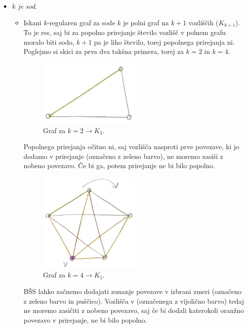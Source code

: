 \documentclass[a4paper,11pt]{article}
\begin{document}
\noindent
\begin{itemize}
\item \textit{$k$ je sod}. 
    \begin{itemize}[label={}]
        \item Iskani $k$-regularen graf za sode $k$ je polni graf na $k + 1$ vozliščih ($K_{k + 1}$). To je res, saj bi za popolno prirejanje število vozlišč v polnem grafu moralo biti sodo, $k + 1$ pa je liho število, torej popolnega prirejanja ni.
                Poglejmo si skici za prva dva takšna primera, torej za $k = 2$ in $k = 4$.

                        \begin{figure}[ht!]
                            \centering
                            \includegraphics[width=50mm]{Slike/k_sod_1.png}
                            \caption{Graf za $k = 2 \rightarrow K_3$.}
                        \end{figure}
                        \noindent
                        Popolnega prirejanja očitno ni, saj vozlišča nasproti prve povezave, ki jo dodamo v prirejanje (označeno z zeleno barvo), ne moremo zasiši z nobeno povezavo. Če bi ga, potem prirejanje ne bi bilo popolno.
                                
                        \newpage
                        \begin{figure}[ht!]
                            \centering
                            \includegraphics[width=50mm]{Slike/k_sod_2.png}
                            \caption{Graf za $k = 4 \rightarrow K_5$.}
                        \end{figure}
                        \noindent
                        BŠS lahko začnemo dodajati zunanje povezave v izbrani zmeri (označeno z zeleno barvo in puščico). Vozlišča v (označenega z vijolično barvo) tedaj ne moremo zasičiti z nobeno povezavo, saj če bi dodali katerokoli oranžno povezavo v prirejanje, ne bi bilo popolno.
    

\end{itemize}
\end{itemize}
\end{document}
